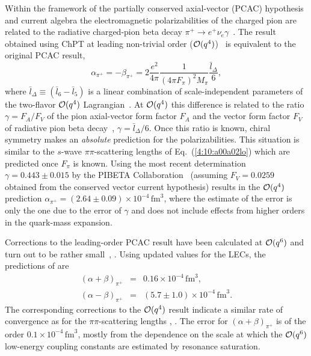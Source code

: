 \documentclass[twoside,12pt]{article}
\begin{document}
   Within the framework of the partially conserved axial-vector (PCAC)
hypothesis and current algebra the electromagnetic
polarizabilities of the charged pion are related to the
radiative charged-pion beta decay $\pi^+\to e^+\nu_e\gamma$~\cite{Terentev:1972ix}.
   The result obtained using ChPT at leading non-trivial order (${\cal O}(q^4)$)~\cite{Bijnens:1987dc}
is equivalent to the original PCAC result,
\begin{displaymath}
\alpha_{\pi^+}=-\beta_{\pi^+}=2 \frac{e^2}{4\pi} \frac{1}{(4\pi F_\pi)^2
M_\pi}\frac{\bar l_\Delta}{6},
\end{displaymath}
where $\bar l_\Delta\equiv(\bar l_6-\bar l_5)$ is a linear
combination of scale-independent parameters of the two-flavor ${\cal O}(q^4)$
Lagrangian~\cite{Gasser:1983yg}.
   At ${\cal O}(q^4)$ this difference is related to the ratio $\gamma=F_A/F_V$ of the
pion axial-vector form factor $F_A$ and the vector form factor
$F_V$ of radiative pion beta decay~\cite{Gasser:1983yg},
$\gamma={\bar{l}}_\Delta/6$.
   Once this ratio is known, chiral symmetry
makes an {\em absolute} prediction for the polarizabilities.
   This situation is similar to the $s$-wave $\pi\pi$-scattering
lengths of Eq.\ (\ref{4:10:a00a02lo}) which are predicted
once $F_\pi$ is known.
   Using the most recent determination $\gamma=0.443\pm 0.015$ by
the PIBETA Collaboration~\cite{Frlez:2003pe} (assuming
$F_V=0.0259$ obtained from the conserved vector current
hypothesis) results in the ${\cal O}(q^4)$ prediction
$\alpha_{\pi^+}=(2.64\pm 0.09)\times 10^{-4}\, \mbox{fm}^3$,
where the estimate of the error is only the one
due to the error of $\gamma$ and does not include effects from
higher orders in the quark-mass expansion.


   Corrections to the leading-order PCAC result have been
calculated at ${\cal O}(q^6)$ and turn out to be rather small~\cite{Burgi:1996qi},
\cite{Gasser:2006qa}.
   Using updated values for the LECs, the predictions of
\cite{Gasser:2006qa} are
\begin{eqnarray}
(\alpha + \beta)_{\pi^+} &=& 0.16 \times 10^{-4}\, \mbox{fm}^3,\label{eq:1.1}\\
(\alpha - \beta)_{\pi^+} &=& (5.7 \pm 1.0)\times 10^{-4}\, \mbox{fm}^3.\label{eq:1.2}
\end{eqnarray}
   The corresponding corrections to the ${\cal O}(q^4)$ result
indicate a similar rate of convergence as for the $\pi\pi$-scattering lengths
\cite{Gasser:1983yg}, \cite{Bijnens:1995yn}.
   The error for $(\alpha + \beta)_{\pi^+}$ is
of the order $0.1\times 10^{-4}\, \mbox{fm}^3$, mostly from the dependence on the scale at which the
${\cal O}(q^6)$ low-energy coupling constants are estimated by resonance saturation.
\end{document}
